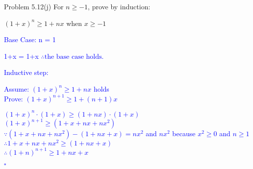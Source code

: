\documentclass{article}
\begin{document}
\begin{addmargin}[2em]{2em}
	Problem 5.12(j) For $n \geq -1$, prove by induction:
	\begin{center}
		$(1+x)^n \geq 1+nx$ when $x \geq -1$
	\end{center} 
	
	\textcolor{blue}{
	Base Case: n = 1
	\begin{addmargin}[2.3cm]{0em}
		1+x = 1+x
		$\therefore \text{the base case holds.}$	
\end{addmargin}}

	\textcolor{blue}{
		Inductive step:
		\begin{addmargin}[2.35cm]{0em}
			Assume: $(1+x)^n \geq 1+nx$ holds\\
			Prove: $(1+x)^{n+1} \geq 1+(n+1)x$
	\end{addmargin}}
	
	\textcolor{blue}{
		\begin{addmargin}[3.5cm]{0em}
			$(1+x)^{n} \cdot (1+x) \geq (1+nx) \cdot (1+x)$\\
			$(1+x)^{n+1} \geq (1+x+nx+nx^2)$\\
			$\because (1+x+nx+nx^2) - (1+nx+x) = nx^2$ and $nx^2$ because $x^2 \geq 0$ and $n \geq 1$\\
			$\therefore 1+x+nx+nx^2 \geq (1+nx+x)$\\
			$\therefore (1+n)^{n+1} \geq 1+nx+x$
		\end{addmargin}
		\begin{flushright}
			$\square$
		\end{flushright}
	}
\end{addmargin}
\end{document}
